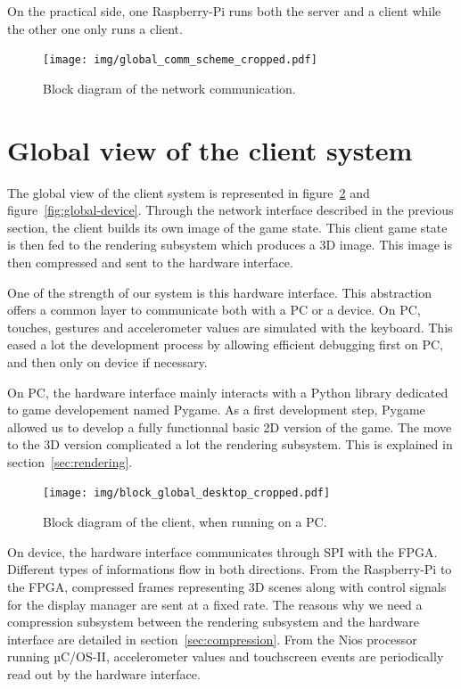 \documentclass[english, DIV=13]{scrartcl}
\begin{document}
On the practical side, one Raspberry-Pi runs both the server and a client while the other
one only runs a client.

\begin{figure}
    \centering
    \texttt{[image: img/global\_comm\_scheme\_cropped.pdf]}
    \caption{Block diagram of the network communication.}
    \label{fig:comm-scheme}
\end{figure}

\section{Global view of the client system}
\label{sec:global-view}

The global view of the client system is represented in figure~\ref{fig:global-desktop}
and figure~\ref{fig:global-device}. Through the network interface described in the
previous section, the client builds its own image of the game state. This client game
state is then fed to the rendering subsystem which produces a 3D image. This image
is then compressed and sent to the hardware interface.

One of the strength of our system is this hardware interface. This abstraction offers
a common layer to communicate both with a PC or a device.
On PC, touches, gestures and accelerometer values are simulated with the keyboard.
This eased a lot the development process by allowing efficient debugging first on PC,
and then only on device if necessary.

On PC, the hardware interface mainly interacts with a Python library dedicated to game
developement named Pygame. As a first development step, Pygame allowed us to develop
a fully functionnal basic 2D version of the game. The move to the 3D version
complicated a lot the rendering subsystem. This is explained in
section~\ref{sec:rendering}.

\begin{figure}
    \centering
    \texttt{[image: img/block\_global\_desktop\_cropped.pdf]}
    \caption{Block diagram of the client, when running on a PC.}
    \label{fig:global-desktop}
\end{figure}

On device, the hardware interface communicates through SPI with the FPGA.
Different types of informations flow in both directions. From the Raspberry-Pi to the
FPGA, compressed frames representing 3D scenes along with control signals for the
display manager are sent at a fixed rate. The reasons why we need a compression
subsystem between the rendering subsystem and the hardware interface are detailed in
section~\ref{sec:compression}. From the Nios processor running µC/OS-II, accelerometer
values and touchscreen events are periodically read out by the hardware interface.
\end{document}
